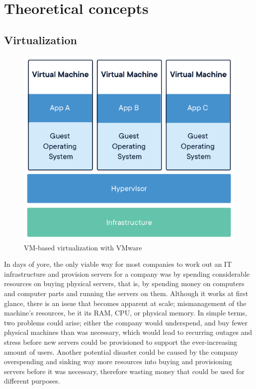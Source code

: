 \documentclass[thesis=B,english]{FITthesis}[2019/12/23]
\begin{document}
\section{Theoretical concepts}

\subsection{Virtualization}

\begin{figure}[H]
\centering
\caption{VM-based virtualization with VMware \cite{what-container}}
\hspace*{-0.4cm}
\includegraphics[scale=0.75]{virtualization}
\end{figure}

In days of yore, the only viable way for most companies to work out an IT infrastructure and provision servers for a company was by spending considerable resources on buying physical servers, that is, by spending money on computers and computer parts and running the servers on them. Although it works at first glance, there is an issue that becomes apparent at scale; mismanagement of the machine’s resources, be it its RAM, CPU, or physical memory. In simple terms, two problems could arise; either the company would underspend, and buy fewer physical machines than was necessary, which would lead to recurring outages and stress before new servers could be provisioned to support the ever-increasing amount of users. Another potential disaster could be caused by the company overspending and sinking way more resources into buying and provisioning servers before it was necessary, therefore wasting money that could be used for different purposes.
\end{document}
